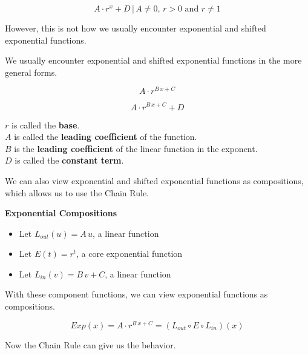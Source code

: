 \documentclass{ximera}
\begin{document}
\[  A \cdot r^x + D   \,  | \,  A \ne 0, \, r > 0 \text{ and } r \ne 1  \]




However, this is not how we usually encounter exponential and shifted exponential functions.  


\begin{template}

We usually encounter exponential and shifted exponential functions in the more general forms. 




\[  A \cdot r^{B \, x + C}     \]


\[  A \cdot r^{B \, x + C} + D    \]

$r$ is called the \textbf{base}. \\
$A$ is called the \textbf{leading coefficient} of the function. \\
$B$ is the \textbf{leading coefficient} of the linear function in the exponent. \\
$D$ is called the \textbf{constant term}. 

\end{template}









We can also view exponential and shifted exponential functions as compositions, which allows us to use the Chain Rule.



\begin{idea}  \textbf{\textcolor{blue!55!black}{Exponential Compositions}} 




\begin{itemize}
\item Let $L_{out}(u) = A \, u $, a linear function
\item Let $E(t) = r^t$, a core exponential function
\item Let $L_{in}(v) = B \, v + C$, a linear function
\end{itemize}

With these component functions, we can view exponential functions as compositions.


\[  Exp(x) =    A \cdot r^{B \, x + C} = (L_{out} \circ E \circ L_{in})(x) \]


Now the Chain Rule can give us the behavior.

\end{idea}
\end{document}
